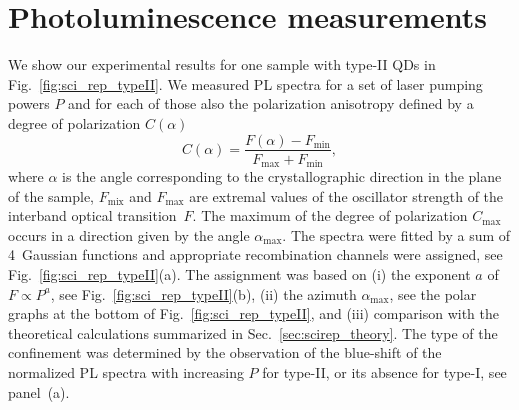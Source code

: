 \section{Photoluminescence measurements}
%
We show our experimental results for one sample with type-II QDs in Fig.~\ref{fig:sci_rep_typeII}. We measured PL spectra for a set of laser pumping powers $P$ and for each of those also the polarization anisotropy defined by a degree of polarization $C(\alpha)$
\begin{equation}
C(\alpha)=\frac{F(\alpha)-F_\mathrm{min}}{F_\mathrm{max}+F_\mathrm{min}},
\end{equation}
where $\alpha$ is the angle corresponding to the crystallographic direction in the plane of the sample, $F_\mathrm{mix}$ and $F_\mathrm{max}$ are extremal values of the oscillator strength of the interband optical transition~$F$. The maximum of the degree of polarization $C_\mathrm{max}$ occurs in a direction given by the angle $\alpha_\mathrm{max}$. The spectra were fitted by a sum of 4~Gaussian functions and appropriate recombination channels were assigned, see Fig.~\ref{fig:sci_rep_typeII}(a). The assignment was based on (i) the exponent $a$ of $F\propto P^a$, see Fig.~\ref{fig:sci_rep_typeII}(b), (ii) the azimuth $\alpha_\mathrm{max}$, see the polar graphs at the bottom of Fig.~\ref{fig:sci_rep_typeII}, and (iii) comparison with the theoretical calculations summarized in Sec.~\ref{sec:scirep_theory}. The type of the confinement was determined by the observation of the blue-shift of the normalized PL spectra with increasing $P$ for type-II, or its absence for type-I, see panel~(a).

